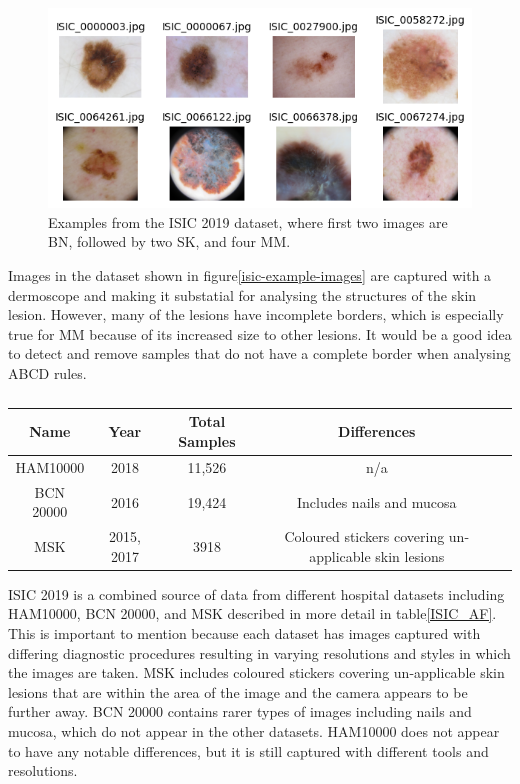\begin{figure}
    \centering
    \includegraphics[scale=0.75]{images/ISIC/isic-example-images.png}
    \caption{Examples from the ISIC 2019 dataset, where first two images are BN, followed by two SK, and four MM.} 
\end{figure}\label{isic-example-images}

Images in the dataset shown in figure\ref{isic-example-images} are captured with a dermoscope and making it substatial for analysing the structures of the skin lesion. However, many of the lesions have incomplete borders, which is especially true for MM because of its increased size to other lesions. It would be a good idea to detect and remove samples that do not have a complete border when analysing ABCD rules.

\begin{table}
    \small
    \begin{tabular}{|c|c|c|c|c|}
        \hline
        Name & Year & Total Samples & Differences \\
        \hline
        HAM10000 & 2018 & 11,526 & n/a
        \\
        \hline
        BCN 20000 & 2016 & 19,424 & Includes nails and mucosa
        \\
        \hline
        MSK & 2015, 2017 & 3918 & Coloured stickers covering un-applicable skin lesions
        \\
        \hline  
    \end{tabular}
    \caption{}
\end{table}\label{ISIC_AF}

ISIC 2019 is a combined source of data from different hospital datasets including HAM10000, BCN 20000, and MSK described in more detail in table\ref{ISIC_AF}. This is important to mention because each dataset has images captured with differing diagnostic procedures resulting in varying resolutions and styles in which the images are taken. MSK includes coloured stickers covering un-applicable skin lesions that are within the area of the image and the camera appears to be further away. BCN 20000 contains rarer types of images including nails and mucosa, which do not appear in the other datasets. HAM10000 does not appear to have any notable differences, but it is still captured with different tools and resolutions.

